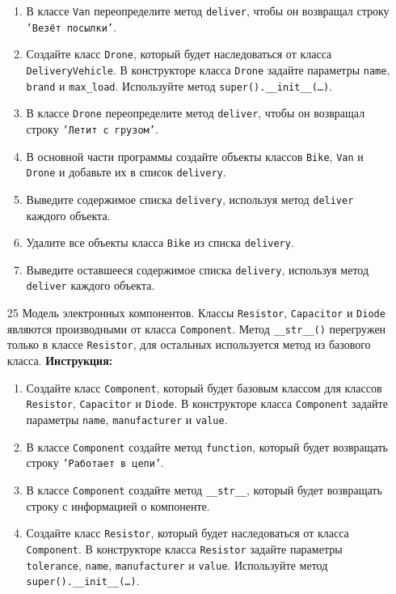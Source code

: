 \begin{enumerate}
\begin{enumerate}
    \item В классе \texttt{Van} переопределите метод \texttt{deliver}, чтобы он возвращал строку \texttt{'Везёт посылки'}.
    \item Создайте класс \texttt{Drone}, который будет наследоваться от класса \texttt{DeliveryVehicle}. В конструкторе класса \texttt{Drone} задайте параметры \texttt{name}, \texttt{brand} и \texttt{max\_load}. Используйте метод \texttt{super().\_\_init\_\_(\ldots)}.
    \item В классе \texttt{Drone} переопределите метод \texttt{deliver}, чтобы он возвращал строку \texttt{'Летит с грузом'}.
    \item В основной части программы создайте объекты классов \texttt{Bike}, \texttt{Van} и \texttt{Drone} и добавьте их в список \texttt{delivery}.
    \item Выведите содержимое списка \texttt{delivery}, используя метод \texttt{deliver} каждого объекта.
    \item Удалите все объекты класса \texttt{Bike} из списка \texttt{delivery}.
    \item Выведите оставшееся содержимое списка \texttt{delivery}, используя метод \texttt{deliver} каждого объекта.
\end{enumerate}
\item[25]
Модель электронных компонентов. Классы \texttt{Resistor}, \texttt{Capacitor} и \texttt{Diode} являются производными от класса \texttt{Component}. Метод \texttt{\_\_str\_\_()} перегружен только в классе \texttt{Resistor}, для остальных используется метод из базового класса.
\textbf{Инструкция:}
\begin{enumerate}
    \item Создайте класс \texttt{Component}, который будет базовым классом для классов \texttt{Resistor}, \texttt{Capacitor} и \texttt{Diode}. В конструкторе класса \texttt{Component} задайте параметры \texttt{name}, \texttt{manufacturer} и \texttt{value}.
    \item В классе \texttt{Component} создайте метод \texttt{function}, который будет возвращать строку \texttt{'Работает в цепи'}.
    \item В классе \texttt{Component} создайте метод \texttt{\_\_str\_\_}, который будет возвращать строку с информацией о компоненте.
    \item Создайте класс \texttt{Resistor}, который будет наследоваться от класса \texttt{Component}. В конструкторе класса \texttt{Resistor} задайте параметры \texttt{tolerance}, \texttt{name}, \texttt{manufacturer} и \texttt{value}. Используйте метод \texttt{super().\_\_init\_\_(\ldots)}.

\end{enumerate}
\end{enumerate}
